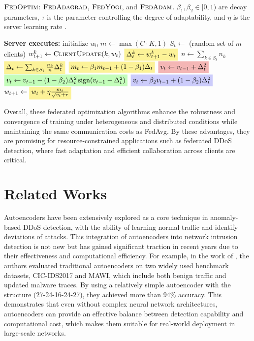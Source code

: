 \begin{algorithm}
  \caption{\colorbox{myyellow}{$\textsc{FedOptim}$}: \colorbox{myred}{$\textsc{FedAdagrad}$}, \colorbox{mygreen}{$\textsc{FedYogi}$}, and \colorbox{myblue}{$\textsc{FedAdam}$}. $\beta_1, \beta_2 \in [0, 1)$ are decay parameters, $\tau$ is the parameter controlling the degree of adaptability, and $\eta$ is the server learning rate \citep{fedoptim}.}
\label{alg:fedoptim}
\begin{algorithmic}[1]
\State \textbf{Server executes:}
\State initialize $w_0$
    \State $m \gets \max(C \cdot K, 1)$
    \State $S_t \gets$ (random set of $m$ clients)
        \State $w^{k}_{t+1} \gets \textsc{ClientUpdate}(k, w_t)$
        \State $\colorbox{myyellow}{$\Delta^{k}_{t} \gets w^{k}_{t+1} - w_t$}$ 
    \EndFor
    \State $n \gets \sum_{k \in S_t} n_k$
    \State $\colorbox{myyellow}{$\Delta_{t} \gets \sum_{k \in S_t} \frac{n_k}{n} \Delta^{k}_{t}$}$
    \State $\colorbox{myyellow}{$m_{t} \gets \beta_1 m_{t-1} + (1 - \beta_1) \Delta_t$}$
    \State $\colorbox{myred}{$v_t \gets v_{t-1} + \Delta_t^2$}$
    \State $\colorbox{mygreen}{$v_t \gets v_{t-1} - (1 - \beta_2) \Delta_t^2 \operatorname{sign}(v_{t-1} - \Delta_t^2)$}$
    \State $\colorbox{myblue}{$v_t \gets \beta_2 v_{t-1} + (1 - \beta_2) \Delta_t^2$}$
    \State $w_{t+1} \gets \colorbox{myyellow}{$w_{t} + \eta \frac{m_t}{\sqrt{v_t} + \tau}$}$
\EndFor
\end{algorithmic}
\end{algorithm}

Overall, these federated optimization algorithms enhance the robustness and convergence of training under heterogeneous and distributed conditions while maintaining the same communication costs as FedAvg. By these advantages, they are promising for resource-constrained applications such as federated DDoS detection, where fast adaptation and efficient collaboration across clients are critical.

\section{Related Works}

Autoencoders have been extensively explored as a core technique in anomaly-based DDoS detection, with the ability of learning normal traffic and identify deviations of attacks. This integration of autoencoders into network intrusion detection is not new but has gained significant traction in recent years due to their effectiveness and computational efficiency. For example,  in the work of \cite{9110372}, the authors evaluated traditional autoencoders on two widely used benchmark datasets, CIC-IDS2017 and MAWI, which include both benign traffic and updated malware traces. By using a relatively simple autoencoder with the structure (27-24-16-24-27), they achieved more than 94\% accuracy. This demonstrates that even without complex neural network architectures, autoencoders can provide an effective balance between detection capability and computational cost, which makes them suitable for real-world deployment in large-scale networks.

